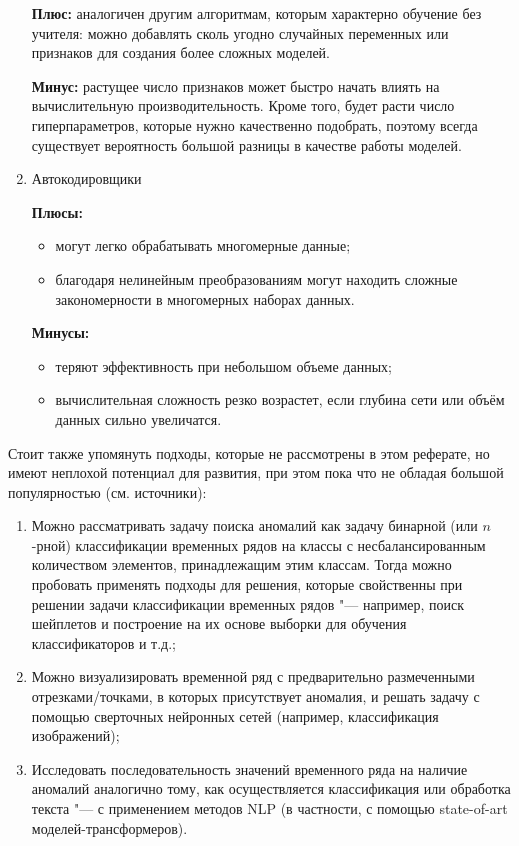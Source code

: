 \documentclass[bachelor, och, referat]{../shiza}
\begin{document}
\begin{enumerate}
        \textbf{Плюс:} аналогичен другим алгоритмам, которым характерно обучение
        без учителя: можно добавлять сколь угодно случайных переменных или
        признаков для создания более сложных моделей.

        \textbf{Минус:} растущее число признаков может быстро начать влиять на
        вычислительную производительность. Кроме того, будет расти число
        гиперпараметров, которые нужно качественно подобрать, поэтому всегда
        существует вероятность большой разницы в качестве работы моделей.

        \item Автокодировщики
        
        \textbf{Плюсы:}
        \begin{itemize}
            \item могут легко обрабатывать многомерные данные;
            \item благодаря нелинейным преобразованиям могут находить сложные
            закономерности в многомерных наборах данных.
        \end{itemize}

        \textbf{Минусы:}
        \begin{itemize}
            \item теряют эффективность при небольшом объеме данных;
            \item вычислительная сложность резко возрастет, если глубина сети
            или объём данных сильно увеличатся.
        \end{itemize}

    \end{enumerate}

    Стоит также упомянуть подходы, которые не рассмотрены в этом реферате, но
    имеют неплохой потенциал для развития, при этом пока что не обладая большой
    популярностью (см. источники):

    \begin{enumerate}
        \item Можно рассматривать задачу поиска аномалий как задачу бинарной
        (или $n$-рной) классификации временных рядов на классы с
        несбалансированным количеством элементов, принадлежащим этим классам.
        Тогда можно пробовать применять подходы для решения, которые свойственны
        при решении задачи классификации временных рядов "--- например, поиск
        шейплетов и построение на их основе выборки для обучения
        классификаторов и т.д.;
        \item Можно визуализировать временной ряд с предварительно размеченными
        отрезками/точками, в которых присутствует аномалия, и решать задачу с
        помощью сверточных нейронных сетей (например, классификация
        изображений);
        \item Исследовать последовательность значений временного ряда на наличие
        аномалий аналогично тому, как осуществляется классификация или обработка
        текста "--- с применением методов NLP (в частности, с помощью
        state-of-art моделей-трансформеров).
    \end{enumerate}
\end{document}
